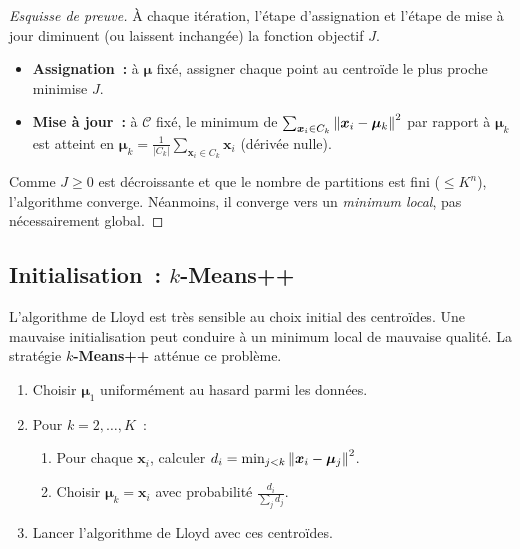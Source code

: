 \begin{proof}[Esquisse de preuve]
\`A chaque it\'eration, l'\'etape d'assignation et l'\'etape de mise \`a jour
diminuent (ou laissent inchang\'ee) la fonction objectif $J$.
\begin{itemize}
  \item \textbf{Assignation~:} \`a $\bm{\mu}$ fix\'e, assigner chaque point
    au centro\"ide le plus proche minimise $J$.
  \item \textbf{Mise \`a jour~:} \`a $\mathcal{C}$ fix\'e, le minimum de
    $\sum_{\bm{x}_i \in C_k} \left\| \bm{x}_i - \bm{\mu}_k \right\|^2$ par rapport \`a
    $\bm{\mu}_k$ est atteint en $\bm{\mu}_k = \frac{1}{|C_k|}\sum_{\bm{x}_i
    \in C_k} \bm{x}_i$ (d\'eriv\'ee nulle).
\end{itemize}
Comme $J \geq 0$ est d\'ecroissante et que le nombre de partitions est fini
($\leq K^n$), l'algorithme converge. N\'eanmoins, il converge vers un
\emph{minimum local}, pas n\'ecessairement global.
\end{proof}

\subsection{Initialisation~: $k$-Means++}

\begin{attention}[title=\textbf{Sensibilit\'e \`a l'initialisation}]
L'algorithme de Lloyd est tr\`es sensible au choix initial des centro\"ides.
Une mauvaise initialisation peut conduire \`a un minimum local de mauvaise
qualit\'e. La strat\'egie \textbf{$k$-Means++} att\'enue ce probl\`eme.
\end{attention}

\begin{algorithme}[title=\textbf{Initialisation $k$-Means++}]
\begin{enumerate}
  \item Choisir $\bm{\mu}_1$ uniform\'ement au hasard parmi les donn\'ees.
  \item Pour $k = 2, \ldots, K$~:
    \begin{enumerate}
      \item Pour chaque $\bm{x}_i$, calculer $d_i = \min_{j < k}
        \left\| \bm{x}_i - \bm{\mu}_j \right\|^2$.
      \item Choisir $\bm{\mu}_k = \bm{x}_i$ avec probabilit\'e
        $\frac{d_i}{\sum_j d_j}$.
    \end{enumerate}
  \item Lancer l'algorithme de Lloyd avec ces centro\"ides.
\end{enumerate}
\end{algorithme}

